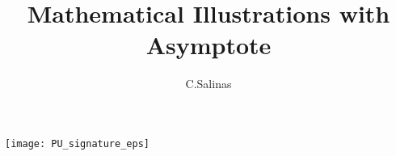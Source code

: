 \documentclass{beamer}
\begin{document}
\title[Intro to Asymptote]{Mathematical Illustrations with Asymptote}

\author[CS]{C.\@ Salinas}

\begin{frame}
  \titlepage
  \begin{center}
    \texttt{[image: PU\_signature\_eps]}
  \end{center}
\end{frame}

\begin{frame}

\end{frame}
% 
% 

% 
% 
\end{document}
